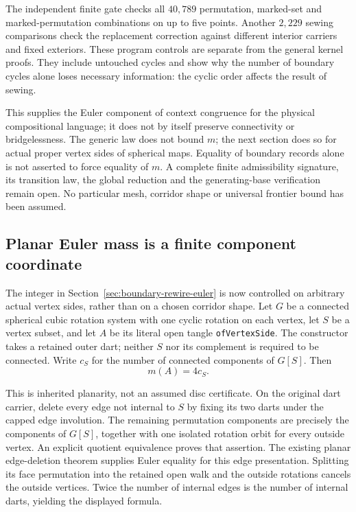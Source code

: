 The independent finite gate checks all $40{,}789$ permutation, marked-set
and marked-permutation combinations on up to five points. Another
$2{,}229$ sewing comparisons check the replacement correction against
different interior carriers and fixed exteriors. These program controls
are separate from the general kernel proofs. They include untouched
cycles and show why the number of boundary cycles alone loses necessary
information: the cyclic order affects the result of sewing.

This supplies the Euler component of context congruence for the physical
compositional language; it does not by itself preserve connectivity or
bridgelessness. The generic law does not bound $m$; the next section does
so for actual proper vertex sides of spherical maps. Equality of boundary
records alone is not asserted to force equality of $m$. A complete finite
admissibility signature, its transition law, the global reduction and
the generating-base verification remain open. No particular mesh,
corridor shape or universal frontier bound has been assumed.

\subsection{Planar Euler mass is a finite component coordinate}
\label{sec:vertex-side-euler-mass}

The integer in Section~\ref{sec:boundary-rewire-euler} is now controlled
on arbitrary actual vertex sides, rather than on a chosen corridor
shape. Let $G$ be a connected spherical cubic rotation system with one
cyclic rotation on each vertex, let $S$ be a vertex subset, and let $A$
be its literal open tangle \texttt{ofVertexSide}. The constructor takes
a retained outer dart; neither $S$ nor its complement is required to be
connected. Write $c_S$ for the number of connected components of $G[S]$.
Then
\[
             m(A)=4c_S.
\]

This is inherited planarity, not an assumed disc certificate. On the
original dart carrier, delete every edge not internal to $S$ by fixing
its two darts under the capped edge involution. The remaining permutation
components are precisely the components of $G[S]$, together with one
isolated rotation orbit for every outside vertex. An explicit quotient
equivalence proves that assertion.
The existing planar edge-deletion theorem supplies Euler equality for
this edge presentation. Splitting its face permutation into the retained
open walk and the outside rotations cancels the outside vertices. Twice
the number of internal edges is the number of internal darts, yielding
the displayed formula.

